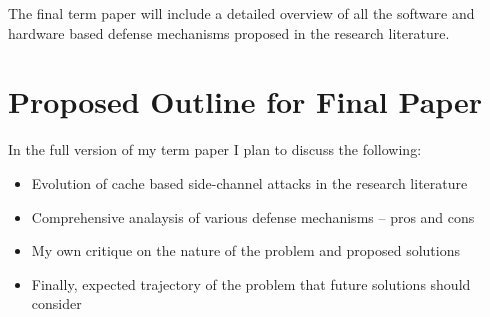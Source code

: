 \documentclass[onecolumn]{IEEEtran}
\begin{document}
The final term paper will include a detailed overview of all the software
and hardware based defense mechanisms proposed in the research literature.

\section{Proposed Outline for Final Paper}

In the full version of my term paper I plan to discuss the following:

\begin{itemize}
\item Evolution of cache based side-channel attacks in the research
literature
\item Comprehensive analaysis of various defense mechanisms -- pros
and cons
\item My own critique on the nature of the problem and proposed
solutions
\item Finally, expected trajectory of the problem that future
solutions should consider
\end{itemize}



\end{document}
